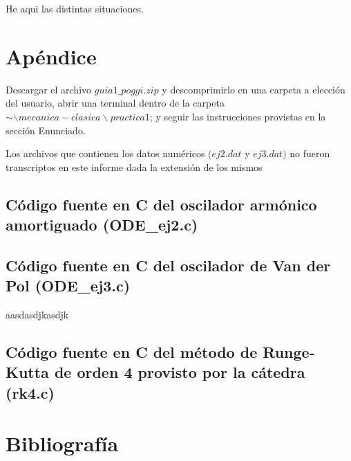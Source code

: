 \documentclass[a4paper,12pt]{article}
\begin{document}
He aqui las distintas situaciones.


\section{Ap\'endice}

Descargar el archivo $guia1\_poggi.zip$ y descomprimirlo en una carpeta a elecci\'on del usuario, abrir una terminal dentro de la carpeta $\sim \backslash mecanica-clasica\backslash practica1$; y seguir las instrucciones provistas en la secci\'on Enunciado.

Los archivos que contienen los datos num\'ericos $(ej2.dat$ y $ej3.dat)$ no fueron transcriptos en este informe dada la extensi\'on de los mismos


\subsection{C\'odigo fuente en C del oscilador arm\'onico amortiguado (ODE\_ej2.c)}



\subsection{C\'odigo fuente en C del oscilador de Van der Pol (ODE\_ej3.c)}
aasdasdjkasdjk

\subsection{C\'odigo fuente en C del m\'etodo de Runge-Kutta de orden 4 provisto por la c\'atedra (rk4.c)}


\section{Bibliograf\'ia}
\end{document}
